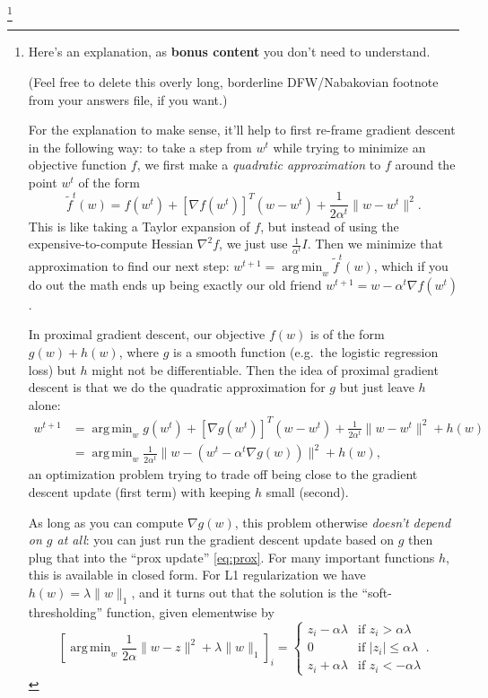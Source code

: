 \documentclass{article}
\DeclareMathOperator*{\argmin}{arg\,min}
\newcommand{\norm}[1]{\lVert #1 \rVert}
\begin{document}
\footnote{%
    Here's an explanation, as \textbf{bonus content} you don't need to understand.

    (Feel free to delete this overly long, borderline DFW/Nabakovian footnote from your answers file, if you want.)

    For the explanation to make sense, it'll help to first re-frame gradient descent in the following way:
    to take a step from $w^t$ while trying to minimize an objective function $f$,
    we first make a \emph{quadratic approximation} to $f$ around the point $w^t$ of the form
    \[
        \tilde f^t(w) = f(w^t) + [\nabla f(w^t)]^T (w - w^t) + \frac{1}{2 \alpha^t} \norm{w - w^t}^2
    .\]
    This is like taking a Taylor expansion of $f$,
    but instead of using the expensive-to-compute Hessian $\nabla^2 f$,
    we just use $\frac{1}{\alpha^t} I$.
    Then we minimize that approximation to find our next step:
    $w^{t+1} = \argmin_{w} \tilde{f}^t(w)$,
    which if you do out the math ends up being exactly our old friend $w^{t+1} = w - \alpha^t \nabla f(w^t)$.\footnotemark

    In proximal gradient descent, our objective $f(w)$ is of the form $g(w) + h(w)$,
    where $g$ is a smooth function (e.g.\ the logistic regression loss)
    but $h$ might not be differentiable.
    Then the idea of proximal gradient descent is that we do the quadratic approximation for $g$ but just leave $h$ alone:
    \begin{align*}
         w^{t+1}
      &= \argmin_w g(w^t) + [\nabla g(w^t)]^T (w - w^t) + \frac{1}{2 \alpha^t} \norm{w - w^t}^2 + h(w)
    \\&= \argmin_w \frac{1}{2 \alpha^t} \norm{w - (w^t - \alpha^t \nabla g(w))}^2 + h(w)
    \tag{prox} \label{eq:prox}
    ,\end{align*}
    an optimization problem trying to trade off being close to the gradient descent update (first term) with keeping $h$ small (second).

    As long as you can compute $\nabla g(w)$, this problem otherwise \emph{doesn't depend on $g$ at all}:
    you can just run the gradient descent update based on $g$ then plug that into the ``prox update'' \eqref{eq:prox}.
    For many important functions $h$, this is available in closed form.
    For L1 regularization we have $h(w) = \lambda \norm{w}_1$,
    and it turns out that the solution is the ``soft-thresholding'' function,
    given elementwise by
    \[
        \left[ \argmin_w \frac{1}{2 \alpha} \norm{w - z}^2 + \lambda \norm{w}_1 \right]_i
        = \begin{cases}
            z_i - \alpha \lambda & \text{if } z_i > \alpha \lambda \\
            0                    & \text{if } \lvert z_i \rvert \le \alpha \lambda \\
            z_i + \alpha \lambda & \text{if } z_i < -\alpha \lambda
        \end{cases}
    .\]
}
\end{document}
